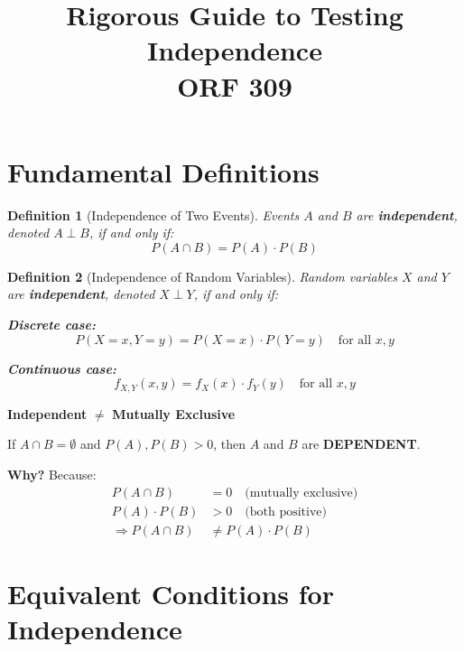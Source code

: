 \documentclass[11pt]{article}
\title{Rigorous Guide to Testing Independence\\ORF 309}
\author{}
\date{}
\newtheorem{definition}{Definition}
\begin{document}
\maketitle

\section{Fundamental Definitions}

\begin{definition}[Independence of Two Events]
Events $A$ and $B$ are \textbf{independent}, denoted $A \perp B$, if and only if:
\begin{equation}
\boxed{P(A \cap B) = P(A) \cdot P(B)}
\end{equation}
\end{definition}

\begin{definition}[Independence of Random Variables]
Random variables $X$ and $Y$ are \textbf{independent}, denoted $X \perp Y$, if and only if:

\textbf{Discrete case:}
\begin{equation}
P(X = x, Y = y) = P(X = x) \cdot P(Y = y) \quad \text{for all } x, y
\end{equation}

\textbf{Continuous case:}
\begin{equation}
f_{X,Y}(x, y) = f_X(x) \cdot f_Y(y) \quad \text{for all } x, y
\end{equation}
\end{definition}

\begin{tcolorbox}[colback=red!5!white,colframe=red!75!black,title=CRITICAL DISTINCTION]
\textbf{Independent} $\neq$ \textbf{Mutually Exclusive}

If $A \cap B = \emptyset$ and $P(A), P(B) > 0$, then $A$ and $B$ are \textbf{DEPENDENT}.

\textbf{Why?} Because:
\begin{align*}
P(A \cap B) &= 0 \quad \text{(mutually exclusive)}\\
P(A) \cdot P(B) &> 0 \quad \text{(both positive)}\\
\Rightarrow P(A \cap B) &\neq P(A) \cdot P(B)
\end{align*}
\end{tcolorbox}

\section{Equivalent Conditions for Independence}
\end{document}
